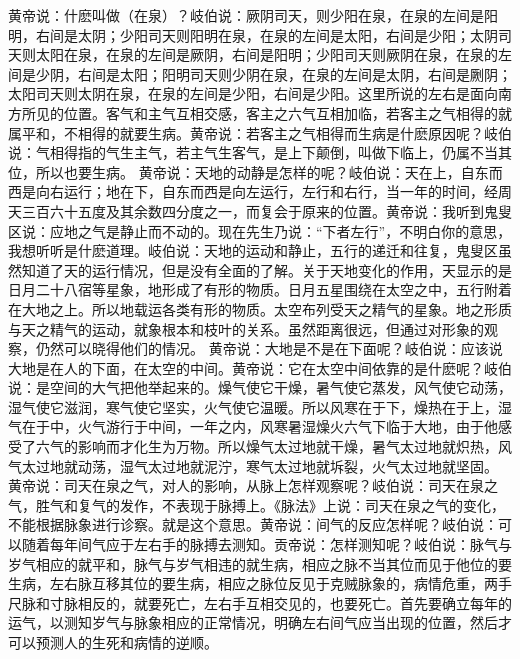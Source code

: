 \documentclass[a4paper,12pt,UTF8,twoside]{ctexbook}
\begin{document}
黄帝说：什麽叫做（在泉）？岐伯说：厥阴司天，则少阳在泉，在泉的左间是阳明，右间是太阴；少阳司天则阳明在泉，在泉的左间是太阳，右间是少阳；太阴司天则太阳在泉，在泉的左间是厥阴，右间是阳明；少阳司天则厥阴在泉，在泉的左间是少阴，右间是太阳；阳明司天则少阴在泉，在泉的左间是太阴，右间是劂阴；太阳司天则太阴在泉，在泉的左间是少阳，右间是少阳。这里所说的左右是面向南方所见的位置。客气和主气互相交感，客主之六气互相加临，若客主之气相得的就属平和，不相得的就要生病。黄帝说：若客主之气相得而生病是什麽原因呢？岐伯说：气相得指的气生主气，若主气生客气，是上下颠倒，叫做下临上，仍属不当其位，所以也要生病。
黄帝说：天地的动静是怎样的呢？岐伯说：天在上，自东而西是向右运行；地在下，自东而西是向左运行，左行和右行，当一年的时间，经周天三百六十五度及其余数四分度之一，而复会于原来的位置。黄帝说：我听到鬼叟区说：应地之气是静止而不动的。现在先生乃说：“下者左行”，不明白你的意思，我想听听是什麽道理。岐伯说：天地的运动和静止，五行的递迁和往复，鬼叟区虽然知道了天的运行情况，但是没有全面的了解。关于天地变化的作用，天显示的是日月二十八宿等星象，地形成了有形的物质。日月五星围绕在太空之中，五行附着在大地之上。所以地载运各类有形的物质。太空布列受天之精气的星象。地之形质与天之精气的运动，就象根本和枝叶的关系。虽然距离很远，但通过对形象的观察，仍然可以晓得他们的情况。
黄帝说：大地是不是在下面呢？岐伯说：应该说大地是在人的下面，在太空的中间。黄帝说：它在太空中间依靠的是什麽呢？岐伯说：是空间的大气把他举起来的。燥气使它干燥，暑气使它蒸发，风气使它动荡，湿气使它滋润，寒气使它坚实，火气使它温暖。所以风寒在于下，燥热在于上，湿气在于中，火气游行于中间，一年之内，风寒暑湿燥火六气下临于大地，由于他感受了六气的影响而才化生为万物。所以燥气太过地就干燥，暑气太过地就炽热，风气太过地就动荡，湿气太过地就泥泞，寒气太过地就坼裂，火气太过地就坚固。
黄帝说：司天在泉之气，对人的影响，从脉上怎样观察呢？岐伯说：司天在泉之气，胜气和复气的发作，不表现于脉搏上。《脉法》上说：司天在泉之气的变化，不能根据脉象进行诊察。就是这个意思。黄帝说：间气的反应怎样呢？岐伯说：可以随着每年间气应于左右手的脉搏去测知。贡帝说：怎样测知呢？岐伯说：脉气与岁气相应的就平和，脉气与岁气相违的就生病，相应之脉不当其位而见于他位的要生病，左右脉互移其位的要生病，相应之脉位反见于克贼脉象的，病情危重，两手尺脉和寸脉相反的，就要死亡，左右手互相交见的，也要死亡。首先要确立每年的运气，以测知岁气与脉象相应的正常情况，明确左右间气应当出现的位置，然后才可以预测人的生死和病情的逆顺。
\end{document}
